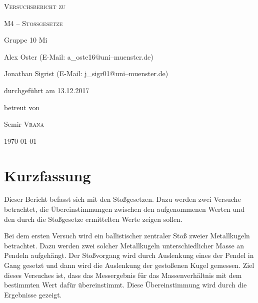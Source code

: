 \documentclass[11pt,a4paper,titlepage, ngerman]{article}
\begin{document}
	\begin{titlepage}
		\centering
		{\scshape\LARGE Versuchsbericht zu \par}
		\vspace{1cm}
		{\scshape\huge M4 -- Stoßgesetze\par}
		\vspace{2.5cm}
		{\LARGE Gruppe 10 Mi\par}
		\vspace{0.5cm}
		{\large Alex Oster (E-Mail: a\_oste16@uni--muenster.de) \par}
		{\large Jonathan Sigrist (E-Mail: j\_sigr01@uni--muenster.de) \par}
		\vfill
		durchgeführt am 13.12.2017\par
		betreut von\par
		{\large Semir \textsc{Vrana}} 
		\vfill	
		{\large \today\par}
	\end{titlepage}
	
	\tableofcontents
	
	\newpage
	
	\section{Kurzfassung}
	
		Dieser Bericht befasst sich mit den Stoßgesetzen. Dazu werden zwei Versuche betrachtet, die Übereinstimmungen zwischen den aufgenommenen Werten und den durch die Stoßgesetze ermittelten Werte zeigen sollen.   
		
		Bei dem ersten Versuch wird ein ballistischer zentraler Stoß zweier Metallkugeln betrachtet. Dazu werden zwei solcher Metallkugeln unterschiedlicher Masse an Pendeln aufgehängt. Der Stoßvorgang wird durch Auslenkung eines der Pendel in Gang gesetzt und dann wird die Auslenkung der gestoßenen Kugel gemessen. Ziel dieses Versuches ist, dass das Messergebnis für das Massenverhältnis mit dem bestimmten Wert dafür übereinstimmt. Diese Übereinstimmung wird durch die Ergebnisse gezeigt.
		
			
	\vspace{2cm} %
	
	 
	\newpage
	
	
\end{document}
